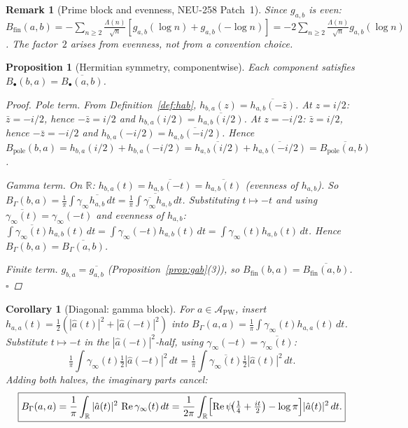 \documentclass[11pt,a4paper]{amsart}
\newtheorem{proposition}[theorem]{Proposition}
\newtheorem{corollary}[theorem]{Corollary}
\newtheorem{remark}[theorem]{Remark}
\begin{document}
\begin{remark}[Prime block and evenness, NEU-258 Patch~1]
Since $g_{a,b}$ is even:
$B_{\mathrm{fin}}(a,b)=-\sum_{n\ge2}\frac{\Lambda(n)}{\sqrt{n}}
[g_{a,b}(\log n)+g_{a,b}(-\log n)]
=-2\sum_{n\ge2}\frac{\Lambda(n)}{\sqrt{n}}g_{a,b}(\log n)$.
The factor~$2$ arises from evenness, not from a convention choice.
\end{remark}

\begin{proposition}[Hermitian symmetry, componentwise]\label{prop:hermitian}
Each component satisfies $B_\bullet(b,a)=\overline{B_\bullet(a,b)}$.
\begin{proof}
\textit{Pole term.}
From Definition~\ref{def:hab}, $h_{b,a}(z)=\overline{h_{a,b}(-\bar{z})}$.
At $z=i/2$: $\bar z=-i/2$, hence $-\bar z=i/2$ and
$h_{b,a}(i/2)=\overline{h_{a,b}(i/2)}$.
At $z=-i/2$: $\bar z=i/2$, hence $-\bar z=-i/2$ and
$h_{b,a}(-i/2)=\overline{h_{a,b}(-i/2)}$.
Hence
$B_{\mathrm{pole}}(b,a)=h_{b,a}(i/2)+h_{b,a}(-i/2)
=\overline{h_{a,b}(i/2)}+\overline{h_{a,b}(-i/2)}
=\overline{B_{\mathrm{pole}}(a,b)}$.

\textit{Gamma term.}
On $\mathbb{R}$: $h_{b,a}(t)=\overline{h_{a,b}(-t)}=\overline{h_{a,b}(t)}$
(evenness of $h_{a,b}$). So
$B_\Gamma(b,a)=\frac{1}{\pi}\int\gamma_\infty\overline{h_{a,b}}\,dt
=\overline{\frac{1}{\pi}\int\overline{\gamma_\infty}h_{a,b}\,dt}$.
Substituting $t\mapsto-t$ and using
$\overline{\gamma_\infty(t)}=\gamma_\infty(-t)$ and evenness of $h_{a,b}$:
$\int\overline{\gamma_\infty(t)}h_{a,b}(t)\,dt
=\int\gamma_\infty(-t)h_{a,b}(t)\,dt
=\int\gamma_\infty(t)h_{a,b}(t)\,dt$.
Hence $B_\Gamma(b,a)=\overline{B_\Gamma(a,b)}$.

\textit{Finite term.}
$g_{b,a}=\overline{g_{a,b}}$ (Proposition~\ref{prop:gab}(3)),
so $B_{\mathrm{fin}}(b,a)=\overline{B_{\mathrm{fin}}(a,b)}$.
\hfill$\square$
\end{proof}
\end{proposition}

\begin{corollary}[Diagonal: gamma block]\label{cor:bgamma-diag}
For $a\in\mathcal{A}_{\mathrm{PW}}$, insert
$h_{a,a}(t)=\tfrac12(|\hat a(t)|^2+|\hat a(-t)|^2)$
into $B_\Gamma(a,a)=\frac{1}{\pi}\int\gamma_\infty(t)h_{a,a}(t)\,dt$.
Substitute $t\mapsto -t$ in the $|\hat a(-t)|^2$-half,
using $\gamma_\infty(-t)=\overline{\gamma_\infty(t)}$:
\[
  \tfrac{1}{\pi}\int\gamma_\infty(t)\tfrac12|\hat a(-t)|^2\,dt
  =\tfrac{1}{\pi}\int\overline{\gamma_\infty(t)}\tfrac12|\hat a(t)|^2\,dt.
\]
Adding both halves, the imaginary parts cancel:
\[
  \boxed{B_\Gamma(a,a)
  = \frac{1}{\pi}\int_{\mathbb{R}}|\hat{a}(t)|^2\,\operatorname{Re}\gamma_\infty(t)\,dt
  = \frac{1}{2\pi}\int_{\mathbb{R}}
    \Bigl[\operatorname{Re}\psi\!\bigl(\tfrac14+\tfrac{it}{2}\bigr)-\log\pi\Bigr]
    |\hat{a}(t)|^2\,dt.}
\]
\end{corollary}
\end{document}
